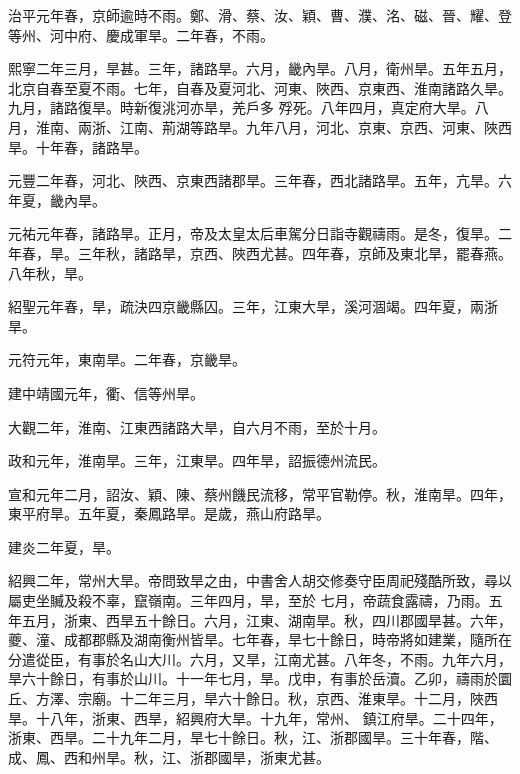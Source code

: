 \begin{pinyinscope}
 治平元年春，京師逾時不雨。鄭、滑、蔡、汝、穎、曹、濮、洺、磁、晉、耀、登等州、河中府、慶成軍旱。二年春，不雨。



 熙寧二年三月，旱甚。三年，諸路旱。六月，畿內旱。八月，衛州旱。五年五月，北京自春至夏不雨。七年，自春及夏河北、河東、陜西、京東西、淮南諸路久旱。九月，諸路復旱。時新復洮河亦旱，羌戶多
 殍死。八年四月，真定府大旱。八月，淮南、兩浙、江南、荊湖等路旱。九年八月，河北、京東、京西、河東、陜西旱。十年春，諸路旱。



 元豐二年春，河北、陜西、京東西諸郡旱。三年春，西北諸路旱。五年，亢旱。六年夏，畿內旱。



 元祐元年春，諸路旱。正月，帝及太皇太后車駕分日詣寺觀禱雨。是冬，復旱。二年春，旱。三年秋，諸路旱，京西、陜西尤甚。四年春，京師及東北旱，罷春燕。八年秋，旱。



 紹聖元年春，旱，疏決四京畿縣囚。三年，江東大旱，溪河涸竭。四年夏，兩浙旱。



 元符元年，東南旱。二年春，京畿旱。



 建中靖國元年，衢、信等州旱。



 大觀二年，淮南、江東西諸路大旱，自六月不雨，至於十月。



 政和元年，淮南旱。三年，江東旱。四年旱，詔振德州流民。



 宣和元年二月，詔汝、穎、陳、蔡州饑民流移，常平官勒停。秋，淮南旱。四年，東平府旱。五年夏，秦鳳路旱。是歲，燕山府路旱。



 建炎二年夏，旱。



 紹興二年，常州大旱。帝問致旱之由，中書舍人胡交修奏守臣周祀殘酷所致，尋以屬吏坐贓及殺不辜，竄嶺南。三年四月，旱，至於
 七月，帝蔬食露禱，乃雨。五年五月，浙東、西旱五十餘日。六月，江東、湖南旱。秋，四川郡國旱甚。六年，夔、潼、成都郡縣及湖南衡州皆旱。七年春，旱七十餘日，時帝將如建業，隨所在分遣從臣，有事於名山大川。六月，又旱，江南尤甚。八年冬，不雨。九年六月，旱六十餘日，有事於山川。十一年七月，旱。戊申，有事於岳瀆。乙卯，禱雨於圜丘、方澤、宗廟。十二年三月，旱六十餘日。秋，京西、淮東旱。十二月，陜西旱。十八年，浙東、西旱，紹興府大旱。十九年，常州、
 鎮江府旱。二十四年，浙東、西旱。二十九年二月，旱七十餘日。秋，江、浙郡國旱。三十年春，階、成、鳳、西和州旱。秋，江、浙郡國旱，浙東尤甚。




\end{pinyinscope}
